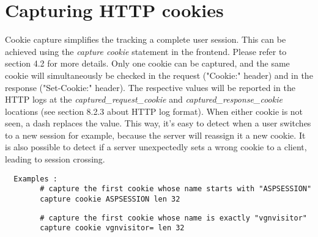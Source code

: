 
\section{Capturing HTTP cookies}

Cookie capture simplifies the tracking a complete user session. This can be
achieved using the \emph{capture cookie} statement in the frontend. Please refer to
section 4.2 for more details. Only one cookie can be captured, and the same
cookie will simultaneously be checked in the request ("Cookie:" header) and in
the response ("Set-Cookie:" header). The respective values will be reported in
the HTTP logs at the \emph{captured\_request\_cookie} and \emph{captured\_response\_cookie}
locations (see section 8.2.3 about HTTP log format). When either cookie is
not seen, a dash \CHAR{-} replaces the value. This way, it's easy to detect when a
user switches to a new session for example, because the server will reassign it
a new cookie. It is also possible to detect if a server unexpectedly sets a
wrong cookie to a client, leading to session crossing.

\begin{verbatim}
  Examples :
        # capture the first cookie whose name starts with "ASPSESSION"
        capture cookie ASPSESSION len 32
\end{verbatim}

\begin{verbatim}
        # capture the first cookie whose name is exactly "vgnvisitor"
        capture cookie vgnvisitor= len 32
\end{verbatim}

